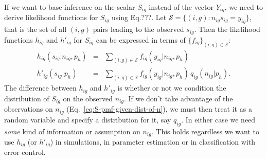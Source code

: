 \documentclass[letterpaper]{article}
\begin{document}
If we want to base inference on the scalar \(S_{ig}\) instead of the vector
\(Y_{ig}\), we need to derive likelihood functions for \(S_{ig}\) using
Eq.???.
Let \(\mathcal{S} = \{(i,g) : n_{ig} s_{ig} = y_{ig}\}\), that is the set of
all \((i,g)\) pairs leading to the observed \(s_{ig}\).  Then the likelihood
functions \(h_{ig}\) and \(h'_{ig}\) for \(S_{ig}\) can be expressed in terms
of \(\{f_{ig}\}_{(i,g)\in\mathcal{S}}\):
\begin{eqnarray}
\label{eq:S-pmf-given-n}
h_{ig}(s_{ig} | n_{ig}, p_h) &=& \sum_{(i,g)\in\mathcal{S}} f_{ig}(y_{ig} | n_{ig}, p_h)
\\
\label{eq:S-pmf-given-dist-of-n}
h'_{ig}(s_{ig} | p_h) &=& \sum_{(i,g)\in\mathcal{S}} f_{ig}(y_{ig} | n_{ig},
p_h) \, q_{ig}(n_{ig}|p_h).
\end{eqnarray}
The difference between \(h_{ig}\) and \(h'_{ig}\) is whether or not we
condition the distribution of \(S_{ig}\) on the observed \(n_{ig}\).  If we
don't take advantage of the observations on \(n_{ig}\) (Eq.~\ref{eq:S-pmf-given-dist-of-n}), we
must then treat it as a random variable and specify a distribution for it, say
\(q_{ig}\). In either case we need \emph{some} kind of information or
assumption on
\(n_{ig}\).  This holds regardless we want to use \(h_{ig}\) (or \(h'_{ig}\))
in simulations, in parameter estimation or in classification with error
control.
\end{document}
